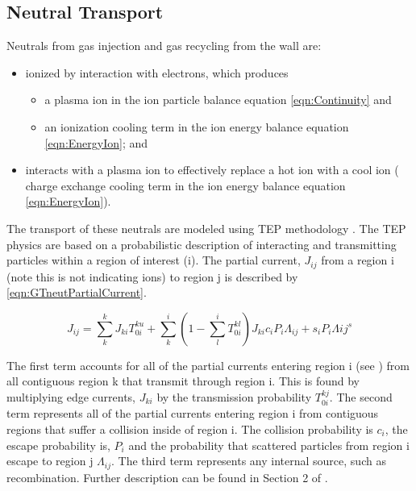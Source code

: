 \subsection{Neutral Transport} \label{sub:NeutralTransport}

Neutrals from gas injection and gas recycling from the wall are:

\begin{itemize}
	\item ionized by interaction with electrons, which produces 
	\begin{itemize}
		\item a plasma ion in the ion particle balance equation \cref{eqn:Continuity} and
		\item an ionization cooling term in the ion energy balance equation \cref{eqn:EnergyIon}; and
	\end{itemize}
%
	\item interacts with a plasma ion to effectively replace a hot ion with a cool ion ( charge exchange cooling term in the ion energy balance equation \cref{eqn:EnergyIon}).
\end{itemize}

The transport of these neutrals are modeled using \acf{TEP} methodology \cite{Stacey1994, Stacey2000a, Stacey2001b, Rubilar2001, Stacey2001c, Mandrekas2003, Zhang2006}. The \ac{TEP} physics are based on a probabilistic description of interacting and transmitting particles within a region of interest (i). The partial current, $J_{ij}$ from a region i (note this is not indicating ions) to region j is described by \cref{eqn:GTneutPartialCurrent}.

\begin{equation}
	J_{ij} = \sum_{k}^{k}J_{ki}T_{0i}^{ku} + \sum_{k}^{i}\left(1-\sum_{l}^{i}T_{0i}^{kl}\right) J_{ki} c_i P_i \Lambda_{ij} + s_i P_i \Lambda{ij}^s
	\label{eqn:GTneutPartialCurrent}
\end{equation}

The first term accounts for all of the partial currents entering region i (see ) from all contiguous region k that transmit through region i. This is found by multiplying edge currents, $J_{ki}$ by the transmission probability $T_{0i}^{kj}$. The second term represents all of the partial currents entering region i from contiguous regions that suffer a collision inside of region i. The collision probability is $c_i$, the escape probability is, $P_i$ and the probability that scattered particles from region i escape to region j $\Lambda_{ij}$. The third term represents any internal source, such as recombination. Further description can be found in Section 2 of \citeauthor{Rubilar2001} \cite{Rubilar2001}.


